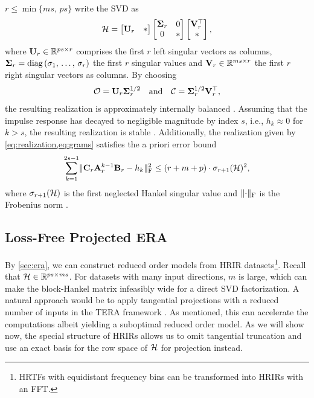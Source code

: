 \documentclass[non-peer-review]{fa2026}
\begin{document}
\(r\leq\min\{ms,\,ps\}\) write the SVD as
%
\begin{equation*}
  \mathcal{H}=
  \begin{bmatrix}
    \mathbf{U}_{r}&\ast
  \end{bmatrix}
  \begin{bmatrix}
    \boldsymbol{\Sigma}_{r}&0\\0&\ast
  \end{bmatrix}
  \begin{bmatrix}
    \mathbf{V}_{r}^\top\\\ast
  \end{bmatrix},
\end{equation*}
%
where \(\matU_{r}\in\R[ps][r]\) comprises the first \(r\) left singular vectors as columns,
\(\boldsymbol{\Sigma}_{r}=\operatorname{diag}\left(\sigma_{1},\,\dots,\,\sigma_{r}\right)\) the first \(r\) singular values and \(\matV_{r}\in\R[ms][r]\)
the first \(r\) right singular vectors as columns. By choosing
%
\begin{equation}
  \label{eq:grams}
  \mathcal{O}=\mathbf{U}_{r}\boldsymbol{\Sigma}_{r}^{1/2}\quad\text{and}\quad\mathcal{C}=\boldsymbol{\Sigma}_{r}^{1/2}\mathbf{V}_{r}^\top,
\end{equation}
%
the resulting realization is approximately internally balanced \cite{kung1978,schutter2000}. Assuming that the impulse
response has decayed to negligible magnitude by index \(s\), i.e., \(h_k\approx0\) for \(k>s\), the resulting
realization is stable \cite{pelling2026,kung1978,kramer2016}. Additionally, the realization given by
\cref{eq:realization,eq:grams} satisfies the a priori error bound
%
\begin{equation}
  \label{eq:original-bound}
  \sum_{k=1}^{2s-1}\lVert\mathbf{C}_{r}\mathbf{A}_{r}^{k-1}\mathbf{B}_{r}-h_{k}\rVert_{\mathrm{F}}^2\leq(r+m+p)\cdot\sigma_{r+1}(\mathcal{H})^2,
\end{equation}
%
where \(\sigma_{r+1}(\mathcal{H})\) is the first neglected Hankel singular value and \(\lVert\cdot\rVert_{\mathrm{F}}\) is the Frobenius norm
\cite{pelling2026,kung1978}.
%
%
\subsection{Loss-Free Projected \acs{ERA}}
\label{sec:tangential}
%
By \cref{sec:era}, we can construct reduced order models from \ac{HRIR} datasets\footnote{\acp{HRTF} with equidistant
  frequency bins can be transformed into \acp{HRIR} with an FFT.}. Recall that \(\H\in\R^{ps\times ms}\). For datasets
with many input directions, \(m\) is large, which can make the block-Hankel matrix infeasibly wide for a direct \ac{SVD}
factorization. A natural approach would be to apply tangential projections with a reduced number of inputs in the
\ac{TERA} framework \cite{kramer2016}. As mentioned, this can accelerate the computations albeit yielding a suboptimal
reduced order model. As we will show now, the special structure of \acp{HRIR} allows us to omit tangential truncation
and use an exact basis for the row space of \(\mathcal{H}\) for projection instead.
\end{document}
